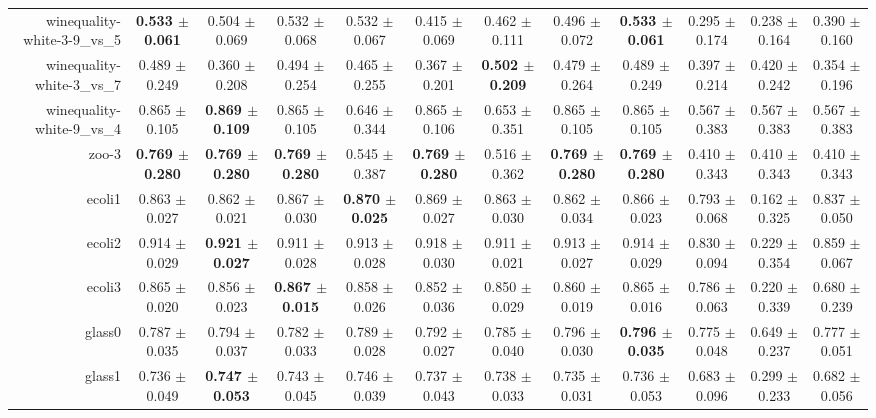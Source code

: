 \begin{table}[!ht]
{\begin{tabular}{r c c c c c c c c c c c}
winequality-white-3-9\_vs\_5 & \textbf{0.533 $\pm$ 0.061} & 0.504 $\pm$ 0.069 & 0.532 $\pm$ 0.068 & 0.532 $\pm$ 0.067 & 0.415 $\pm$ 0.069 & 0.462 $\pm$ 0.111 & 0.496 $\pm$ 0.072 & \textbf{0.533 $\pm$ 0.061} & 0.295 $\pm$ 0.174 & 0.238 $\pm$ 0.164 & 0.390 $\pm$ 0.160 \\
winequality-white-3\_vs\_7 & 0.489 $\pm$ 0.249 & 0.360 $\pm$ 0.208 & 0.494 $\pm$ 0.254 & 0.465 $\pm$ 0.255 & 0.367 $\pm$ 0.201 & \textbf{0.502 $\pm$ 0.209} & 0.479 $\pm$ 0.264 & 0.489 $\pm$ 0.249 & 0.397 $\pm$ 0.214 & 0.420 $\pm$ 0.242 & 0.354 $\pm$ 0.196 \\
winequality-white-9\_vs\_4 & 0.865 $\pm$ 0.105 & \textbf{0.869 $\pm$ 0.109} & 0.865 $\pm$ 0.105 & 0.646 $\pm$ 0.344 & 0.865 $\pm$ 0.106 & 0.653 $\pm$ 0.351 & 0.865 $\pm$ 0.105 & 0.865 $\pm$ 0.105 & 0.567 $\pm$ 0.383 & 0.567 $\pm$ 0.383 & 0.567 $\pm$ 0.383 \\
zoo-3 & \textbf{0.769 $\pm$ 0.280} & \textbf{0.769 $\pm$ 0.280} & \textbf{0.769 $\pm$ 0.280} & 0.545 $\pm$ 0.387 & \textbf{0.769 $\pm$ 0.280} & 0.516 $\pm$ 0.362 & \textbf{0.769 $\pm$ 0.280} & \textbf{0.769 $\pm$ 0.280} & 0.410 $\pm$ 0.343 & 0.410 $\pm$ 0.343 & 0.410 $\pm$ 0.343 \\
ecoli1 & 0.863 $\pm$ 0.027 & 0.862 $\pm$ 0.021 & 0.867 $\pm$ 0.030 & \textbf{0.870 $\pm$ 0.025} & 0.869 $\pm$ 0.027 & 0.863 $\pm$ 0.030 & 0.862 $\pm$ 0.034 & 0.866 $\pm$ 0.023 & 0.793 $\pm$ 0.068 & 0.162 $\pm$ 0.325 & 0.837 $\pm$ 0.050 \\
ecoli2 & 0.914 $\pm$ 0.029 & \textbf{0.921 $\pm$ 0.027} & 0.911 $\pm$ 0.028 & 0.913 $\pm$ 0.028 & 0.918 $\pm$ 0.030 & 0.911 $\pm$ 0.021 & 0.913 $\pm$ 0.027 & 0.914 $\pm$ 0.029 & 0.830 $\pm$ 0.094 & 0.229 $\pm$ 0.354 & 0.859 $\pm$ 0.067 \\
ecoli3 & 0.865 $\pm$ 0.020 & 0.856 $\pm$ 0.023 & \textbf{0.867 $\pm$ 0.015} & 0.858 $\pm$ 0.026 & 0.852 $\pm$ 0.036 & 0.850 $\pm$ 0.029 & 0.860 $\pm$ 0.019 & 0.865 $\pm$ 0.016 & 0.786 $\pm$ 0.063 & 0.220 $\pm$ 0.339 & 0.680 $\pm$ 0.239 \\
glass0 & 0.787 $\pm$ 0.035 & 0.794 $\pm$ 0.037 & 0.782 $\pm$ 0.033 & 0.789 $\pm$ 0.028 & 0.792 $\pm$ 0.027 & 0.785 $\pm$ 0.040 & 0.796 $\pm$ 0.030 & \textbf{0.796 $\pm$ 0.035} & 0.775 $\pm$ 0.048 & 0.649 $\pm$ 0.237 & 0.777 $\pm$ 0.051 \\
glass1 & 0.736 $\pm$ 0.049 & \textbf{0.747 $\pm$ 0.053} & 0.743 $\pm$ 0.045 & 0.746 $\pm$ 0.039 & 0.737 $\pm$ 0.043 & 0.738 $\pm$ 0.033 & 0.735 $\pm$ 0.031 & 0.736 $\pm$ 0.053 & 0.683 $\pm$ 0.096 & 0.299 $\pm$ 0.233 & 0.682 $\pm$ 0.056 \\

\end{tabular}}
\end{table}
